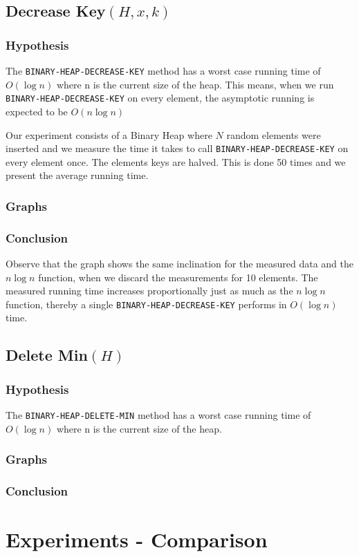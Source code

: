 \documentclass[a4paper,oneside,11pt]{article}
\begin{document}
\subsection*{Decrease Key$(H,x,k)$}

\subsubsection*{Hypothesis}
The \texttt{BINARY-HEAP-DECREASE-KEY} method has a worst case running time of $O(\log n)$ where n is the current size of the heap. This means, when we run \texttt{BINARY-HEAP-DECREASE-KEY} on every element, the asymptotic running is expected to be $O(n\log n)$ 

Our experiment consists of a Binary Heap where $N$ random elements were inserted and we measure the time it takes to call \texttt{BINARY-HEAP-DECREASE-KEY} on every element once. The elements keys are halved. This is done 50 times and we present the average running time.
\subsubsection*{Graphs}

\subsubsection*{Conclusion}
Observe that the graph shows the same inclination for the measured data and the $n\log n$ function, when we discard the measurements for 10 elements. The measured running time increases proportionally just as much as the $n\log n$ function, thereby a single \texttt{BINARY-HEAP-DECREASE-KEY} performs in $O(\log n)$ time.

\subsection*{Delete Min$(H)$}

\subsubsection*{Hypothesis}
The \texttt{BINARY-HEAP-DELETE-MIN} method has a worst case running time of $O(\log n)$ where n is the current size of the heap.
\subsubsection*{Graphs}

\subsubsection*{Conclusion}

\section*{Experiments - Comparison}
\end{document}
